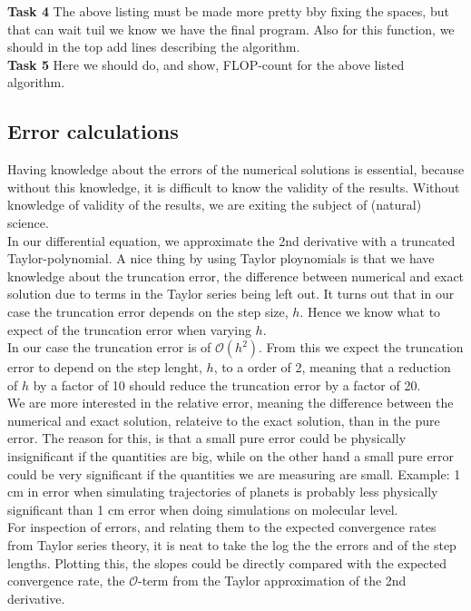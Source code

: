 \documentclass{article}
\begin{document}
\textbf{Task 4} The above listing must be made more pretty bby fixing the spaces, but that can wait tuil we know we have the final program. Also for this function, we should in the top add lines describing the algorithm.\\

\textbf{Task 5} Here we should do, and show, FLOP-count for the above listed algorithm.

\subsection{Error calculations}
Having knowledge about the errors of the numerical solutions is essential, because without this knowledge, it is difficult to know the validity of the results. Without knowledge of validity of the results, we are exiting the subject of (natural) science. \\

In our differential equation, we approximate the 2nd derivative with a truncated Taylor-polynomial. A nice thing by using Taylor ploynomials is that we have knowledge about the truncation error, the difference between numerical and exact solution due to terms in the Taylor series being left out. It turns out that in our case the truncation error depends on the step size, $h$. Hence we know what to expect of the truncation error when varying $h$. \\

In our case the truncation error is of $\mathcal{O}(h^2)$. From this we expect the truncation error to depend on the step lenght, $h$, to a order of 2, meaning that a reduction of $h$ by a factor of 10 should reduce the truncation error by a factor of 20.\\

We are more interested in the relative error, meaning the difference between the numerical and exact solution, relateive to the exact solution, than in the pure error. The reason for this, is that a small pure error could be physically insignificant if the quantities are big, while on the other hand a small pure error could be very significant if the quantities we are measuring are small. Example: 1 cm in error when simulating trajectories of planets is probably less physically significant than 1 cm error when doing simulations on molecular level.\\

For inspection of errors, and relating them to the expected convergence rates from Taylor series theory, it is neat to take the log the the errors and of the step lengths. Plotting this, the slopes could be directly compared with the expected convergence rate, the $\mathcal{O}$-term from the Taylor approximation of the 2nd derivative.\\
\end{document}
